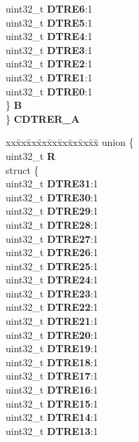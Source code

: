 \begin{DoxyCompactItemize}
\begin{tabbing}
\>\>uint32\_t {\bfseries DTRE6}:1\\
\>\>uint32\_t {\bfseries DTRE5}:1\\
\>\>uint32\_t {\bfseries DTRE4}:1\\
\>\>uint32\_t {\bfseries DTRE3}:1\\
\>\>uint32\_t {\bfseries DTRE2}:1\\
\>\>uint32\_t {\bfseries DTRE1}:1\\
\>\>uint32\_t {\bfseries DTRE0}:1\\
\>\} {\bfseries B}\\
\} {\bfseries CDTRER\_A}\\

\end{tabbing}\item 
\mbox{\label{structETPU__tag_af13e8bd731737e2e0d778aa17fe4aed0}} 
\begin{tabbing}
xx\=xx\=xx\=xx\=xx\=xx\=xx\=xx\=xx\=\kill
union \{\\
\>uint32\_t {\bfseries R}\\
\>struct \{\\
\>\>uint32\_t {\bfseries DTRE31}:1\\
\>\>uint32\_t {\bfseries DTRE30}:1\\
\>\>uint32\_t {\bfseries DTRE29}:1\\
\>\>uint32\_t {\bfseries DTRE28}:1\\
\>\>uint32\_t {\bfseries DTRE27}:1\\
\>\>uint32\_t {\bfseries DTRE26}:1\\
\>\>uint32\_t {\bfseries DTRE25}:1\\
\>\>uint32\_t {\bfseries DTRE24}:1\\
\>\>uint32\_t {\bfseries DTRE23}:1\\
\>\>uint32\_t {\bfseries DTRE22}:1\\
\>\>uint32\_t {\bfseries DTRE21}:1\\
\>\>uint32\_t {\bfseries DTRE20}:1\\
\>\>uint32\_t {\bfseries DTRE19}:1\\
\>\>uint32\_t {\bfseries DTRE18}:1\\
\>\>uint32\_t {\bfseries DTRE17}:1\\
\>\>uint32\_t {\bfseries DTRE16}:1\\
\>\>uint32\_t {\bfseries DTRE15}:1\\
\>\>uint32\_t {\bfseries DTRE14}:1\\
\>\>uint32\_t {\bfseries DTRE13}:1\\

\end{tabbing}
\end{DoxyCompactItemize}

